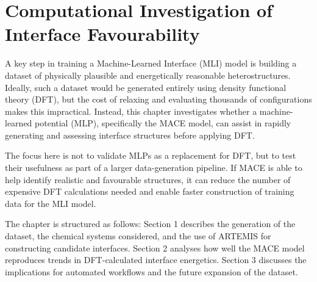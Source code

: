 \chapter{Computational Investigation of Interface Favourability} \label{chapter:computational_investigation}

A key step in training a Machine-Learned Interface (MLI) model is building a dataset of physically plausible and energetically reasonable heterostructures. Ideally, such a dataset would be generated entirely using density functional theory (DFT), but the cost of relaxing and evaluating thousands of configurations makes this impractical. Instead, this chapter investigates whether a machine-learned potential (MLP), specifically the MACE model, can assist in rapidly generating and assessing interface structures before applying DFT.

The focus here is not to validate MLPs as a replacement for DFT, but to test their usefulness as part of a larger data-generation pipeline. If MACE is able to help identify realistic and favourable structures, it can reduce the number of expensive DFT calculations needed and enable faster construction of training data for the MLI model.

The chapter is structured as follows: Section 1 describes the generation of the dataset, the chemical systems considered, and the use of ARTEMIS for constructing candidate interfaces. Section 2 analyses how well the MACE model reproduces trends in DFT-calculated interface energetics. Section 3 discusses the implications for automated workflows and the future expansion of the dataset.